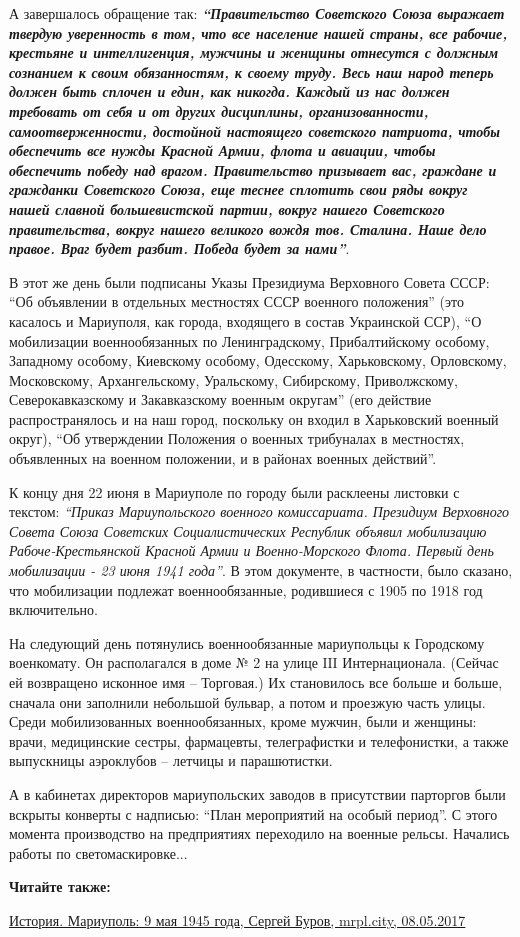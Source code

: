 А завершалось обращение так: \textbf{\em\enquote{Правительство Советского Союза выражает твердую
уверенность в том, что все население нашей страны, все рабочие, крестьяне и
интеллигенция, мужчины и женщины отнесутся с должным сознанием к своим
обязанностям, к своему труду. Весь наш народ теперь должен быть сплочен и един,
как никогда. Каждый из нас должен требовать от себя и от других дисциплины,
организованности, самоотверженности, достойной настоящего советского патриота,
чтобы обеспечить все нужды Красной Армии, флота и авиации, чтобы обеспечить
победу над врагом. Правительство призывает вас, граждане и гражданки Советского
Союза, еще теснее сплотить свои ряды вокруг нашей славной большевистской
партии, вокруг нашего Советского правительства, вокруг нашего великого вождя
тов. Сталина. Наше дело правое. Враг будет разбит. Победа будет за нами}}.

В этот же день были подписаны Указы Президиума Верховного Совета СССР: \enquote{Об
объявлении в отдельных местностях СССР военного положения} (это касалось и
Мариуполя, как города, входящего в состав Украинской ССР), \enquote{О мобилизации
военнообязанных по Ленинградскому, Прибалтийскому особому, Западному особому,
Киевскому особому, Одесскому, Харьковскому, Орловскому, Московскому,
Архангельскому, Уральскому, Сибирскому, Приволжскому, Северокавказскому и
Закавказскому военным округам} (его действие распространялось и на наш город,
поскольку он входил в Харьковский военный округ), \enquote{Об утверждении Положения о
военных трибуналах в местностях, объявленных на военном положении, и в районах
военных действий}.

К концу дня 22 июня в Мариуполе по городу были расклеены листовки с текстом:
\emph{\enquote{Приказ Мариупольского военного комиссариата. Президиум Верховного Совета Союза
Советских Социалистических Республик объявил мобилизацию Рабоче-Крестьянской
Красной Армии и Военно-Морского Флота. Первый день мобилизации - 23 июня 1941
года}}. В этом документе, в частности, было сказано, что мобилизации подлежат
военнообязанные, родившиеся с 1905 по 1918 год включительно. 

На следующий день потянулись военнообязанные мариупольцы к Городскому
военкомату. Он располагался в доме № 2 на улице ΙΙΙ Интернационала. (Сейчас ей
возвращено исконное имя – Торговая.) Их становилось все больше и больше,
сначала они заполнили небольшой бульвар, а потом и проезжую часть улицы. Среди
мобилизованных военнообязанных, кроме мужчин, были и женщины: врачи,
медицинские сестры, фармацевты, телеграфистки и телефонистки, а также
выпускницы аэроклубов – летчицы и парашютистки.

А в кабинетах директоров мариупольских заводов в присутствии парторгов были
вскрыты конверты с надписью: \enquote{План мероприятий на особый период}. С этого
момента производство на предприятиях переходило на военные рельсы. Начались
работы по светомаскировке...

\textbf{Читайте также:} 

\href{https://mrpl.city/blogs/view/istoriya-mariupol-9-maya-1945-goda}{%
История. Мариуполь: 9 мая 1945 года, Сергей Буров, mrpl.city, 08.05.2017}
